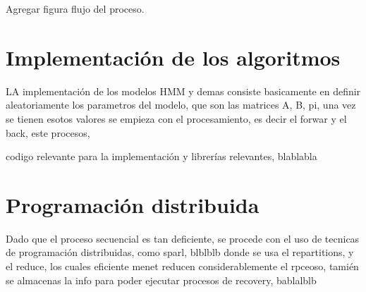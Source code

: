 Agregar figura flujo del proceso.



\section{Implementación de los algoritmos } %
\label{section4.2}

LA implementación de los modelos HMM y demas consiste basicamente en definir aleatoriamente los parametros del modelo, que son las matrices A, B, pi, una vez se tienen esotos valores se empieza con el procesamiento, es decir el forwar y el back, este procesos, 

codigo relevante para la implementación y librerías relevantes, blablabla



\section{Programación distribuida} %
\label{section4.3}

Dado que el proceso secuencial es tan deficiente, se procede con el uso de tecnicas de programación distribuidas, como sparl, blblblb donde se usa el repartitions, y el reduce, los cuales eficiente menet reducen considerablemente el rpceoso, tamién se almacenas la info para poder ejecutar procesos de recovery, bablalblb
